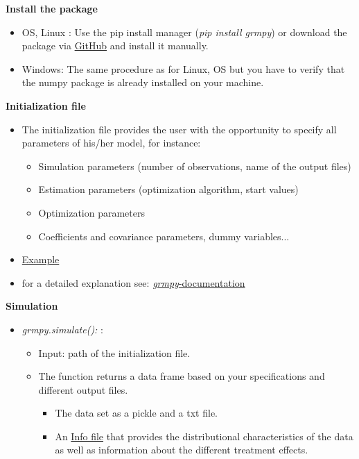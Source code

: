 \begin{frame}
\textbf{Install the package}
\begin{itemize}\setlength\itemsep{1em}
\item OS, Linux : Use the pip install manager (\textit{pip install grmpy}) or download the package via \href{https://github.com/grmToolbox/grmpy}{GitHub} and install it manually.
\item Windows:  The same procedure as for Linux, OS but you have to verify that the numpy package is already installed on your machine.
\end{itemize}
\end{frame}

\begin{frame}
\textbf{Initialization file}
\begin{itemize}\setlength\itemsep{1em}
\item The initialization file provides the user with the opportunity to specify all parameters of his/her model, for instance:\medskip
  \begin{itemize}\setlength\itemsep{1em}
  \item Simulation parameters (number of observations, name of the output files)
  \item Estimation parameters (optimization algorithm, start values)
  \item Optimization parameters
  \item Coefficients and covariance parameters, dummy variables...
  \end{itemize}
\item \href{../shared/04_grmpy_tutorial/application/tutorial.grmpy.ini}{Example}
\item for a detailed explanation see: \href{http://grmpy.readthedocs.io/en/latest/tutorial.html}{\textit{grmpy}-documentation}
\end{itemize}
\end{frame}

\begin{frame}
\textbf{Simulation}
\begin{itemize}\setlength\itemsep{1em}
\item \textit{grmpy.simulate():} :\medskip
\begin{itemize}\setlength\itemsep{1em}
\item Input: path of the initialization file.
\item The function returns a data frame based on your specifications and different output files.
\begin{itemize}\setlength\itemsep{1em}
\item The data set as a pickle and a txt file.
\item An \href{../shared/04_grmpy_tutorial/examples/data.grmpy.info}{Info file} that provides the distributional characteristics of the data as well as information about the different treatment effects.
\end{itemize}

\end{itemize}
\end{itemize}
\end{frame}

